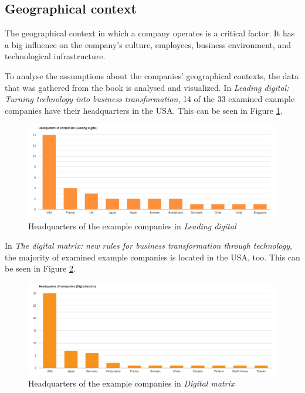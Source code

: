 \documentclass[a4]{scrartcl}
\begin{document}








\subsection{Geographical context} \label{subsec:geo_assumptions}


The geographical context in which a company operates is a critical factor. It has a big influence on the company's culture, employees, business environment, and technological infrastructure. 

To analyse the assumptions about the companies' geographical contexts, the data that was gathered from the book is analysed and visualized. In \textit{Leading digital: Turning technology into business transformation}, 14 of the 33 examined example companies have their headquarters in the USA. This can be seen in Figure \ref{fig:LD_graph}. \cite{leadingdigital}

\begin{figure}[h!]
	\centering
	\includegraphics[width=1\textwidth]{images/LD_graph.png}
	\caption{Headquarters of the example companies in \textit{Leading digital} \cite{leadingdigital}}
	\label{fig:LD_graph}
\end{figure}

In \textit{The digital matrix: new rules for business transformation through technology}, the majority of examined example companies is located in the USA, too. This can be seen in Figure \ref{fig:DM_graph}.

\begin{figure}[h!]
	\centering
	\includegraphics[width=1\textwidth]{images/MD_graph.png}
	\caption{Headquarters of the example companies in \textit{Digital matrix} \cite{digitalmatrix}}
	\label{fig:DM_graph}
\end{figure}
\end{document}
